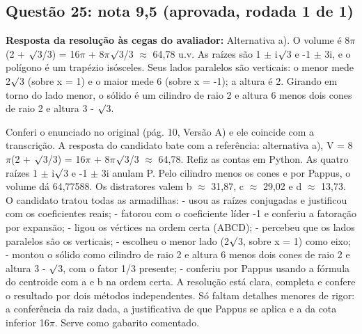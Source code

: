 \documentclass{article}%
\begin{document}
\subsection*{Questão 25: nota 9,5 (aprovada, rodada 1 de 1)}%
\textbf{Resposta da resolução às cegas do avaliador:} Alternativa a). O volume é 8$\pi$(2 + $\surd$3/3) = 16$\pi$ + 8$\pi$$\surd$3/3 $\approx$ 64,78 u.v.\newline%
\newline%
As raízes são 1 $\pm$ i$\surd$3 e -1 $\pm$ 3i, e o polígono é um trapézio isósceles. Seus lados paralelos são verticais: o menor mede 2$\surd$3 (sobre x = 1) e o maior mede 6 (sobre x = -1); a altura é 2. Girando em torno do lado menor, o sólido é um cilindro de raio 2 e altura 6 menos dois cones de raio 2 e altura 3 - $\surd$3.\par %
Conferi o enunciado no original (pág. 10, Versão A) e ele coincide com a transcrição. A resposta do candidato bate com a referência: alternativa a), V = 8$\pi$(2 + $\surd$3/3) = 16$\pi$ + 8$\pi$$\surd$3/3 $\approx$ 64,78. Refiz as contas em Python. As quatro raízes 1 $\pm$ i$\surd$3 e -1 $\pm$ 3i anulam P. Pelo cilindro menos os cones e por Pappus, o volume dá 64,77588. Os distratores valem b $\approx$ 31,87, c $\approx$ 29,02 e d $\approx$ 13,73.\newline%
\newline%
O candidato tratou todas as armadilhas:\newline%
{-} usou as raízes conjugadas e justificou com os coeficientes reais;\newline%
{-} fatorou com o coeficiente líder -1 e conferiu a fatoração por expansão;\newline%
{-} ligou os vértices na ordem certa (ABCD);\newline%
{-} percebeu que os lados paralelos são os verticais;\newline%
{-} escolheu o menor lado (2$\surd$3, sobre x = 1) como eixo;\newline%
{-} montou o sólido como cilindro de raio 2 e altura 6 menos dois cones de raio 2 e altura 3 - $\surd$3, com o fator 1/3 presente;\newline%
{-} conferiu por Pappus usando a fórmula do centroide com a e b na ordem certa.\newline%
\newline%
A resolução está clara, completa e confere o resultado por dois métodos independentes. Só faltam detalhes menores de rigor: a conferência da raiz dada, a justificativa de que Pappus se aplica e a da cota inferior 16$\pi$. Serve como gabarito comentado.%
\end{document}
